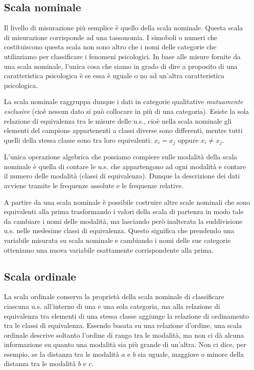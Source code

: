 \documentclass[
]{memoir}
\theoremstyle{definition}
\theoremstyle{definition}
\theoremstyle{definition}
\theoremstyle{definition}
\theoremstyle{remark}
\begin{document}
\hypertarget{scala-nominale}{%
\subsection{Scala nominale}\label{scala-nominale}}

Il livello di misurazione più semplice è quello della scala nominale. Questa scala di misurazione corrisponde ad una tassonomia. I simoboli o numeri che costituiscono questa scala non sono altro che i nomi delle categorie che utilizziamo per classificare i fenomeni psicologici. In base alle misure fornite da una scala nominale, l'unica cosa che siamo in grado di dire a proposito di una caratteristica psicologica è se essa è uguale o no ad un'altra caratteristica psicologica.

La scala nominale raggruppa dunque i dati in categorie qualitative \emph{mutuamente esclusive} (cioè nessun dato si può collocare in più di una categoria).
Esiste la sola relazione di equivalenza tra le misure delle u.s., cioè
nella scala nominale gli elementi del campione appartenenti a classi
diverse sono differenti, mentre tutti quelli della stessa classe sono
tra loro equivalenti: \(x_i = x_j\) oppure \(x_i \neq x_j\).

L'unica operazione algebrica che possiamo compiere sulle modalità della scala nominale è quella di contare le u.s. che appartengono ad ogni modalità e contare il numero delle modalità (classi di equivalenza). Dunque la descrizione dei dati avviene tramite le frequenze assolute e le frequenze relative.

A partire da una scala nominale è possibile costruire altre scale nominali che sono equivalenti alla prima trasformando i valori della scala di partenza in modo tale
da cambiare i nomi delle modalità, ma lasciando però inalterata la suddivisione u.s. nelle medesime classi di equivalenza. Questo significa che prendendo una variabile misurata su scala nominale e cambiando i nomi delle sue categorie otteniamo una nuova variabile esattamente corrispondente alla prima.

\hypertarget{scala-ordinale}{%
\subsection{Scala ordinale}\label{scala-ordinale}}

La scala ordinale conserva la proprietà della scala nominale di classificare ciascuna u.s. all'interno di una e una sola categoria, ma alla relazione di equivalenza tra elementi di una stessa classe aggiunge la relazione di ordinamento tra le classi di equivalenza. Essendo basata su una relazione d'ordine, una scala ordinale descrive soltanto l'ordine di rango tra le modalità, ma non ci dà alcuna informazione su quanto una modalità sia più grande di un'altra. Non ci dice, per esempio, se la distanza tra le modalità \(a\) e \(b\) sia uguale, maggiore o minore della distanza tra le modalità \(b\) e \(c\).
\end{document}
